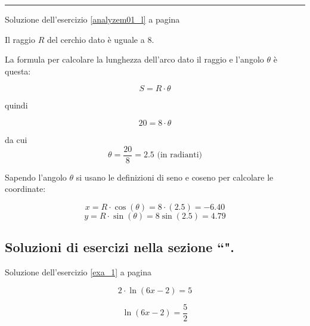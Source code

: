 \vspace{1cm}
\hrule
\vspace{1cm}


Soluzione dell'esercizio \ref{analyzem01_l} a pagina \pageref{analyzem01_l}\label{analyzem01_s}

Il raggio $R$ del cerchio dato è uguale a $8$.

La formula per calcolare la lunghezza dell'arco dato il raggio e l'angolo $\theta$ è questa:

\begin{equation*}
S=R\cdot\theta
\end{equation*}

quindi 

\begin{equation*}
20 = 8 \cdot \theta 
\end{equation*}

da cui 
\begin{equation*}
\theta =\frac{20}{8} = 2.5 \textrm{ (in radianti)}
\end{equation*}

Sapendo l'angolo $\theta$ si usano le definizioni di seno e coseno per calcolare le coordinate:

\begin{equation*}
x=R\cdot\cos(\theta) = 8\cdot (2.5) = -6.40
\end{equation*}
\begin{equation*}
y = R\cdot \sin(\theta) = 8 \sin(2.5) = 4.79
\end{equation*}

\subsection{Soluzioni di esercizi nella sezione ``\textbf{}".}


Soluzione dell'esercizio \ref{exa_1} a pagina \pageref{exa_1}\label{sola_1}

\begin{equation*}
2\cdot \ln(6x - 2) = 5
\end{equation*}

\begin{equation*}
\ln(6x - 2) = \frac{5}{2}
\end{equation*}

